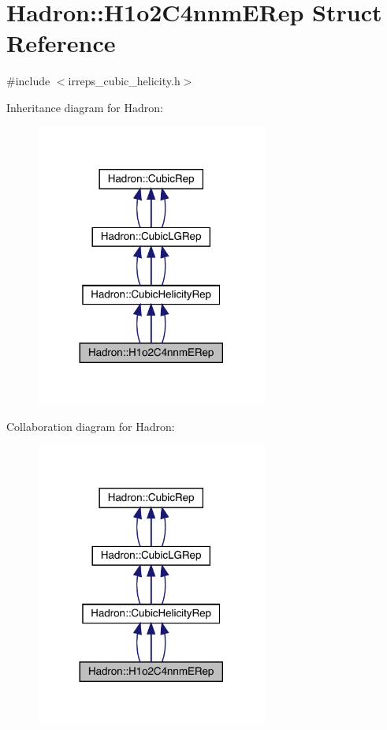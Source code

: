 \hypertarget{structHadron_1_1H1o2C4nnmERep}{}\section{Hadron\+:\+:H1o2\+C4nnm\+E\+Rep Struct Reference}
\label{structHadron_1_1H1o2C4nnmERep}


{\ttfamily \#include $<$irreps\+\_\+cubic\+\_\+helicity.\+h$>$}



Inheritance diagram for Hadron\+:
\nopagebreak
\begin{figure}[H]
\begin{center}
\leavevmode
\includegraphics[width=216pt]{d0/d2b/structHadron_1_1H1o2C4nnmERep__inherit__graph}
\end{center}
\end{figure}


Collaboration diagram for Hadron\+:
\nopagebreak
\begin{figure}[H]
\begin{center}
\leavevmode
\includegraphics[width=216pt]{dd/db8/structHadron_1_1H1o2C4nnmERep__coll__graph}
\end{center}
\end{figure}
